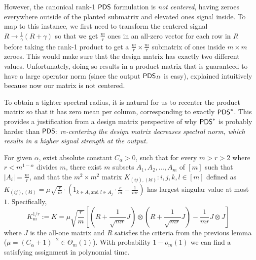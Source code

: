 \documentclass[final,12pt]{colt2023} %
\newcommand\1[1]{\mathbb{I}_{\left\{#1\right\}}}
\begin{document}
However, the canonical rank-1 $\mathsf{PDS}$ formulation is \emph{not centered}, having zeroes everywhere outside of the planted submatrix and elevated ones signal inside.
To map to this instance, we first need to transform the centered signal $R\to \frac{1}{\gamma}(R+\gamma)$ so that we get $\frac{m}{r}$ ones in an all-zero vector for each row in $R$ before taking the rank-1 product to get a $\frac{m}{r}\times \frac{m}{r}$ submatrix of ones inside $m\times m$ zeroes. This would make sure that the design matrix has exactly two different values. Unfortunately, doing so results in a product matrix that is guaranteed to have a large operator norm (since the output $\mathsf{PDS}_D$ is easy), explained intuitively because now our matrix is not centered. 

To obtain a tighter spectral radius, it is natural for us to recenter the product matrix so that it has zero mean per column, corresponding to exactly $\mathsf{PDS}^*$. This provides a justification from a design matrix perspective of why $\mathsf{PDS}^*$ is probably harder than $\mathsf{PDS}$: \emph{re-centering the design matrix decreases spectral norm, which results in a higher signal strength at the output.}
\begin{lemma}\label{RegularBig}
For given $\alpha$, exist absolute constant $C_{\alpha}>0$, such that for every $m>r>2$ where $r<m^{1-\alpha}$ divides $m$, there exist $m$ subsets $A_1, A_2,\dots, A_m$ of $[m]$ such that $|A_i|=\frac{m}{r}$, and that the $m^2\times m^2$ matrix $K_{(ij), (kl)}: i, j, k, l\in[m]$ defined as
$K_{(ij), (kl)}=\mu\sqrt{\frac{r}{m}}\cdot (1_{k\in A_i\, \text{and }l\in A_j}\cdot \frac{r}{m} -\frac{1}{mr})$ has largest singular value at most $1$.
Specifically,
$$K_{m}^{1/r}:=K=\mu\sqrt{\frac{r}{m}}\left[(R+\frac{1}{\sqrt{mr}}J)\otimes (R+\frac{1}{\sqrt{mr}}J)-\frac{1}{mr}J\otimes J\right]$$
where $J$ is the all-one matrix and $R$ satisfies the criteria from the previous lemma ($\mu=(C_{\alpha}+1)^{-2}\in \Theta_m(1)$).
With probability $1-o_m(1)$ we can find a satisfying assignment in polynomial time.
\end{lemma}

\end{document}
